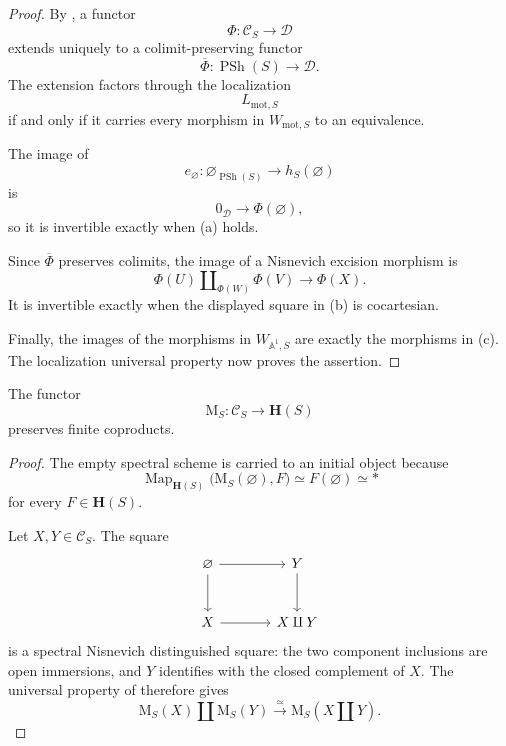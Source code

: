 \begin{proof}
By
,
a functor
\[
    \Phi
    \colon
    \mathcal C_S
    \longrightarrow
    \mathcal D
\]
extends uniquely to a colimit-preserving functor
\[
    \overline\Phi
    \colon
    \operatorname{PSh}(S)
    \longrightarrow
    \mathcal D.
\]
The extension factors through the localization
\[
    L_{\mathrm{mot},S}
\]
if and only if it carries every morphism in
\(W_{\mathrm{mot},S}\) to an equivalence.

The image of
\[
    e_{\varnothing}
    \colon
    \varnothing_{\operatorname{PSh}(S)}
    \longrightarrow
    h_S(\varnothing)
\]
is
\[
    0_{\mathcal D}
    \longrightarrow
    \Phi(\varnothing),
\]
so it is invertible exactly when (a) holds.

Since \(\overline\Phi\) preserves colimits, the image of a Nisnevich
excision morphism is
\[
    \Phi(U)
    \amalg_{\Phi(W)}
    \Phi(V)
    \longrightarrow
    \Phi(X).
\]
It is invertible exactly when the displayed square in (b) is
cocartesian.

Finally, the images of the morphisms in
\(W_{\mathbb A^1,S}\) are exactly the morphisms in (c).
The localization universal property now proves the assertion.
\end{proof}

\begin{corollary}
\label{cor:motivic-yoneda-finite-coproducts}
The functor
\[
    \mathrm M_S
    \colon
    \mathcal C_S
    \longrightarrow
    \mathbf H(S)
\]
preserves finite coproducts.
\end{corollary}

\begin{proof}
The empty spectral scheme is carried to an initial object because
\[
    \operatorname{Map}_{\mathbf H(S)}
    \bigl(
        \mathrm M_S(\varnothing),
        F
    \bigr)
    \simeq
    F(\varnothing)
    \simeq
    *
\]
for every \(F\in\mathbf H(S)\).

Let \(X,Y\in\mathcal C_S\).  The square
\[
\begin{tikzcd}[column sep=large, row sep=large]
    \varnothing
        \arrow[r]
        \arrow[d]
    &
    Y
        \arrow[d]
    \\
    X
        \arrow[r]
    &
    X\amalg Y
\end{tikzcd}
\]
is a spectral Nisnevich distinguished square: the two component
inclusions are open immersions, and \(Y\) identifies with the closed
complement of \(X\).  The universal property of
therefore gives
\[
    \mathrm M_S(X)
    \amalg
    \mathrm M_S(Y)
    \xrightarrow{\simeq}
    \mathrm M_S(X\amalg Y).
\]
\end{proof}

